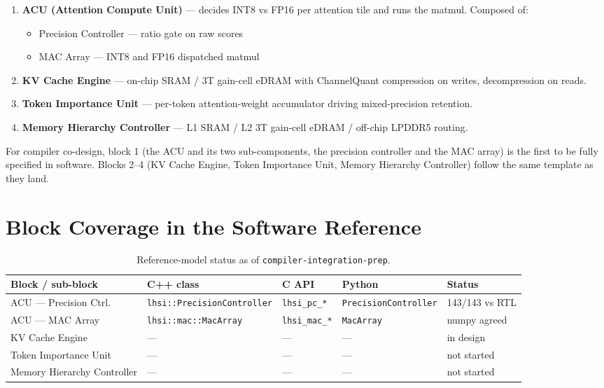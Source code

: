 \documentclass[11pt]{article}
\begin{document}
\begin{enumerate}
\item \textbf{ACU (Attention Compute Unit)} --- decides INT8 vs FP16
      per attention tile and runs the matmul. Composed of:
      \begin{itemize}
      \item Precision Controller --- ratio gate on raw scores
      \item MAC Array --- INT8 and FP16 dispatched matmul
      \end{itemize}
\item \textbf{KV Cache Engine} --- on-chip SRAM / 3T gain-cell eDRAM with
      ChannelQuant compression on writes, decompression on reads.
\item \textbf{Token Importance Unit} --- per-token attention-weight
      accumulator driving mixed-precision retention.
\item \textbf{Memory Hierarchy Controller} --- L1 SRAM / L2 3T gain-cell eDRAM /
      off-chip LPDDR5 routing.
\end{enumerate}

For compiler co-design, block 1 (the ACU and its two sub-components,
the precision controller and the MAC array) is the first to be fully
specified in software. Blocks 2--4 (KV Cache Engine, Token Importance
Unit, Memory Hierarchy Controller) follow the same template as they
land.

\section{Block Coverage in the Software Reference}
\label{sec:coverage}

\begin{table}[ht]
\centering
\footnotesize
\caption{Reference-model status as of \texttt{compiler-integration-prep}.}
\label{tab:coverage}
\setlength{\tabcolsep}{4pt}
\begin{tabular}{@{}p{3.0cm} p{4.0cm} p{1.8cm} p{3.3cm} p{2.3cm}@{}}
\toprule
Block / sub-block           & C++ class                          & C API                 & Python                       & Status \\
\midrule
ACU --- Precision Ctrl.     & \texttt{lhsi::PrecisionController} & \texttt{lhsi\_pc\_*}  & \texttt{PrecisionController} & 143/143 vs RTL \\
ACU --- MAC Array           & \texttt{lhsi::mac::MacArray}       & \texttt{lhsi\_mac\_*} & \texttt{MacArray}            & numpy agreed \\
KV Cache Engine             & ---                                & ---                   & ---                          & in design \\
Token Importance Unit       & ---                                & ---                   & ---                          & not started \\
Memory Hierarchy Controller & ---                                & ---                   & ---                          & not started \\
\bottomrule
\end{tabular}
\end{table}
\end{document}
